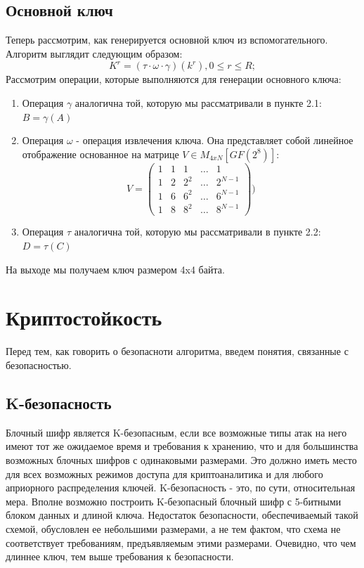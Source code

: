 \documentclass[12pt]{article}
\begin{document}
\subsection{Основной ключ}
Теперь рассмотрим, как генерируется основной ключ из вспомогательного. Алгоритм выглядит следующим образом:
\[K^{r} = (\tau \cdot \omega \cdot \gamma)(k^{r}), 0 \leq r \leq R;\]
\newline
Рассмотрим операции, которые выполняются для генерации основного ключа:
\begin{enumerate}
    \item Операция $\gamma$ аналогична той, которую мы рассматривали в пункте 2.1: $B = \gamma(A)$
    \item Операция $\omega$ - операция извлечения ключа. Она представляет собой линейное отображение основанное на матрице $V \in M_{4xN}[GF(2^{8})]$:
    \[V = \left(
        \begin{array}{ccccc}
        1 & 1 & 1 & \ldots & 1\\
        1 & 2 & 2^{2} & \ldots & 2^{N-1}\\
        1 & 6 & 6^{2} & \ldots & 6^{N-1}\\
        1 & 8 & 8^{2} & \ldots & 8^{N-1}
        \end{array}
    \right))\]
    \item Операция $\tau$ аналогична той, которую мы рассматривали в пункте 2.2: $D = \tau(C)$
\end{enumerate}
\newline
На выходе мы получаем ключ размером 4x4 байта.


\section{Криптостойкость}
Перед тем, как говорить о безопасноти алгоритма, введем понятия, связанные с безопасностью.

\subsection{K-безопасность}
Блочный шифр является K-безопасным, если все возможные типы атак на него имеют тот же ожидаемое время и требования к хранению, что и для большинства возможных блочных шифров с одинаковыми размерами. Это должно иметь место для всех возможных режимов доступа для криптоаналитика и для любого априорного распределения ключей.
K-безопасность - это, по сути, относительная мера. Вполне возможно построить K-безопасный блочный шифр с 5-битными блоком данных и длиной ключа. Недостаток безопасности, обеспечиваемый такой схемой, обусловлен ее небольшими размерами, а не тем фактом, что схема не соответствует требованиям, предъявляемым этими размерами. Очевидно, что чем длиннее ключ, тем выше требования к безопасности.
\end{document}
